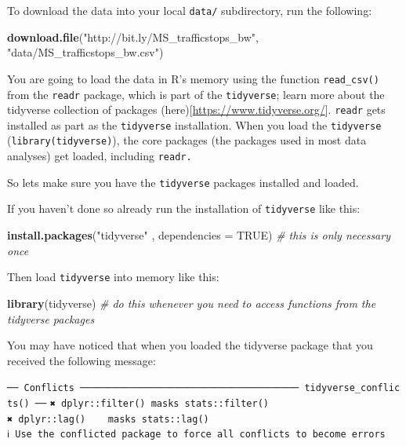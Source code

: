 \documentclass[
]{book}
\newenvironment{Shaded}{\begin{snugshade}}{\end{snugshade}}
\newcommand{\AttributeTok}[1]{\textcolor[rgb]{0.13,0.29,0.53}{#1}}
\newcommand{\CommentTok}[1]{\textcolor[rgb]{0.56,0.35,0.01}{\textit{#1}}}
\newcommand{\ConstantTok}[1]{\textcolor[rgb]{0.56,0.35,0.01}{#1}}
\newcommand{\FunctionTok}[1]{\textcolor[rgb]{0.13,0.29,0.53}{\textbf{#1}}}
\newcommand{\NormalTok}[1]{#1}
\newcommand{\StringTok}[1]{\textcolor[rgb]{0.31,0.60,0.02}{#1}}
\begin{document}
To download the data into your local \texttt{data/} subdirectory, run the following:

\begin{Shaded}
\begin{Highlighting}[]
\FunctionTok{download.file}\NormalTok{(}\StringTok{"http://bit.ly/MS\_trafficstops\_bw"}\NormalTok{, }\StringTok{"data/MS\_trafficstops\_bw.csv"}\NormalTok{)}
\end{Highlighting}
\end{Shaded}

You are going to load the data in R's memory using the function \texttt{read\_csv()} from the \texttt{readr} package, which is part of the \texttt{tidyverse}; learn more about the tidyverse collection of packages (here){[}\url{https://www.tidyverse.org/}{]}. \texttt{readr} gets installed as part as the \texttt{tidyverse} installation. When you load the \texttt{tidyverse} (\texttt{library(tidyverse)}), the core packages (the packages used in most data analyses) get loaded, including \texttt{readr.}

So lets make sure you have the \texttt{tidyverse} packages installed and loaded.

If you haven't done so already run the installation of \texttt{tidyverse} like this:

\begin{Shaded}
\begin{Highlighting}[]
\FunctionTok{install.packages}\NormalTok{(}\StringTok{"tidyverse"}\NormalTok{ , }\AttributeTok{dependencies =} \ConstantTok{TRUE}\NormalTok{) }\CommentTok{\# this is only necessary once}
\end{Highlighting}
\end{Shaded}

Then load \texttt{tidyverse} into memory like this:

\begin{Shaded}
\begin{Highlighting}[]
\FunctionTok{library}\NormalTok{(tidyverse) }\CommentTok{\# do this whenever you need to access functions from the tidyverse packages }
\end{Highlighting}
\end{Shaded}

You may have noticed that when you loaded the tidyverse package that you received the following message:

\texttt{──\ Conflicts\ ───────────────────────────────────────\ tidyverse\_conflicts()\ ──}
\texttt{✖\ dplyr::filter()\ masks\ stats::filter()}
\texttt{✖\ dplyr::lag()\ \ \ \ masks\ stats::lag()}
\texttt{ℹ\ Use\ the\ conflicted\ package\ to\ force\ all\ conflicts\ to\ become\ errors}
\end{document}
